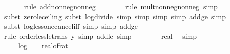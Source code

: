 \begin{isabellebody}
\ \ \ \ \ \isamarkupfalse%
\ {\isacharparenleft}{\kern0pt}rule\ add{\isacharunderscore}{\kern0pt}nonneg{\isacharunderscore}{\kern0pt}nonneg{\isacharparenright}{\kern0pt}\isanewline
\ \ \ \ \ \ \isamarkupfalse%
\ {\isacharparenleft}{\kern0pt}rule\ mult{\isacharunderscore}{\kern0pt}nonneg{\isacharunderscore}{\kern0pt}nonneg{\isacharcomma}{\kern0pt}\ simp{\isacharparenright}{\kern0pt}\isanewline
\ \ \ \ \ \ \isamarkupfalse%
\ {\isacharparenleft}{\kern0pt}subst\ zero{\isacharunderscore}{\kern0pt}le{\isacharunderscore}{\kern0pt}ceiling{\isacharcomma}{\kern0pt}\ subst\ log{\isacharunderscore}{\kern0pt}divide{\isacharcomma}{\kern0pt}\ simp{\isacharcomma}{\kern0pt}\ simp{\isacharcomma}{\kern0pt}\ simp{\isacharcomma}{\kern0pt}\ simp\ add{\isacharcolon}{\kern0pt}{\isasymdelta}{\isacharunderscore}{\kern0pt}ge{\isacharunderscore}{\kern0pt}{}{\isacharcomma}{\kern0pt}\ simp{\isacharparenright}{\kern0pt}\isanewline
\ \ \ \ \ \ \isamarkupfalse%
\ {\isacharparenleft}{\kern0pt}subst\ log{\isacharunderscore}{\kern0pt}less{\isacharunderscore}{\kern0pt}one{\isacharunderscore}{\kern0pt}cancel{\isacharunderscore}{\kern0pt}iff{\isacharcomma}{\kern0pt}\ simp{\isacharcomma}{\kern0pt}\ simp\ add{\isacharcolon}{\kern0pt}{\isasymdelta}{\isacharunderscore}{\kern0pt}ge{\isacharunderscore}{\kern0pt}{}{\isacharparenright}{\kern0pt}\isanewline
\ \ \ \ \isamarkupfalse%
\ {\isacharparenleft}{\kern0pt}rule\ order{\isacharunderscore}{\kern0pt}less{\isacharunderscore}{\kern0pt}le{\isacharunderscore}{\kern0pt}trans{\isacharbrackleft}{\kern0pt}\ y{\isacharequal}{\kern0pt}{\isachardoublequoteopen}{}{\isachardoublequoteclose}{\isacharbrackright}{\kern0pt}{\isacharcomma}{\kern0pt}\ simp\ add{\isacharcolon}{\kern0pt}{\isasymdelta}{\isacharunderscore}{\kern0pt}le{\isacharunderscore}{\kern0pt}{}{\isacharcomma}{\kern0pt}\ simp{\isacharplus}{\kern0pt}{\isacharparenright}{\kern0pt}\isanewline
\isanewline
\ \ \isamarkupfalse%
\ {\isachardoublequoteopen}{}\ {\isasymle}\ {}\ {\isacharplus}{\kern0pt}\ {\isacharparenleft}{\kern0pt}{}{}{\isacharcolon}{\kern0pt}{\isacharcolon}{\kern0pt}real{\isacharparenright}{\kern0pt}{\isachardoublequoteclose}\ \isamarkupfalse%
\ simp\isanewline
\ \ \isamarkupfalse%
\ \isamarkupfalse%
\ {\isachardoublequoteopen}{\isachardot}{\kern0pt}{\isachardot}{\kern0pt}{\isachardot}{\kern0pt}\ {\isasymle}\ {}\ {\isacharasterisk}{\kern0pt}\ log\ {}\ {\isacharparenleft}{\kern0pt}{}\ {\isacharslash}{\kern0pt}\ real{\isacharunderscore}{\kern0pt}of{\isacharunderscore}{\kern0pt}rat\ {\isasymdelta}{\isacharparenright}{\kern0pt}\ {\isacharplus}{\kern0pt}\ {}{}{\isachardoublequoteclose}\isanewline

\end{isabellebody}
